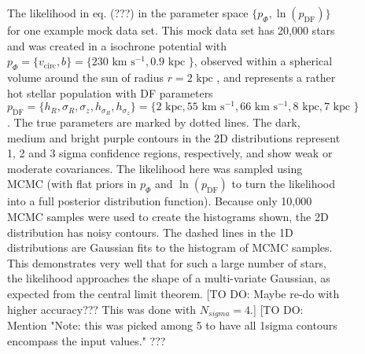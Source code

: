 \begin{figure}
\caption{The likelihood in eq. (???) in the parameter space $\{p_\Phi,\ln(p_\text{DF})\}$ for one example mock data set. This mock data set has 20,000 stars and was created in a isochrone potential with $p_\Phi = \{v_\text{circ},b \}=\{230 \text{ km s$^{-1}$},0.9\text{ kpc } \}$, observed within a spherical volume around the sun of radius $r = 2 \text{ kpc }$, and represents a rather hot stellar population with DF parameters $p_\text{DF} = \{ h_R, \sigma_R, \sigma_z,h_{\sigma_R},h_{\sigma_z}\} =\{2 \text{ kpc}, 55 \text{ km s$^{-1}$}, 66 \text{ km s$^{-1}$}, 8 \text{ kpc}, 7 \text{ kpc }\} $.  The true parameters are marked by dotted lines. The dark, medium and bright purple contours in the 2D distributions represent 1, 2 and 3 sigma confidence regions, respectively, and show weak or moderate covariances. The likelihood here was sampled using MCMC (with flat priors in $p_\Phi$ and  $\ln(p_\text{DF})$ to turn the likelihood into a full posterior distribution function). Because only 10,000 MCMC samples were used to create the histograms shown, the 2D distribution has noisy contours. The dashed lines in the 1D distributions are Gaussian fits to the histogram of MCMC samples. This demonstrates very well that for such a large number of stars, the likelihood approaches the shape of a multi-variate Gaussian, as expected from the central limit theorem. [TO DO: Maybe re-do with higher accuracy??? This was done with $N_{sigma} = 4$.] [TO DO: Mention "Note: this was picked among 5 to have all 1sigma contours encompass the input values." ???}
\label{fig:triangleplot}
\end{figure}



